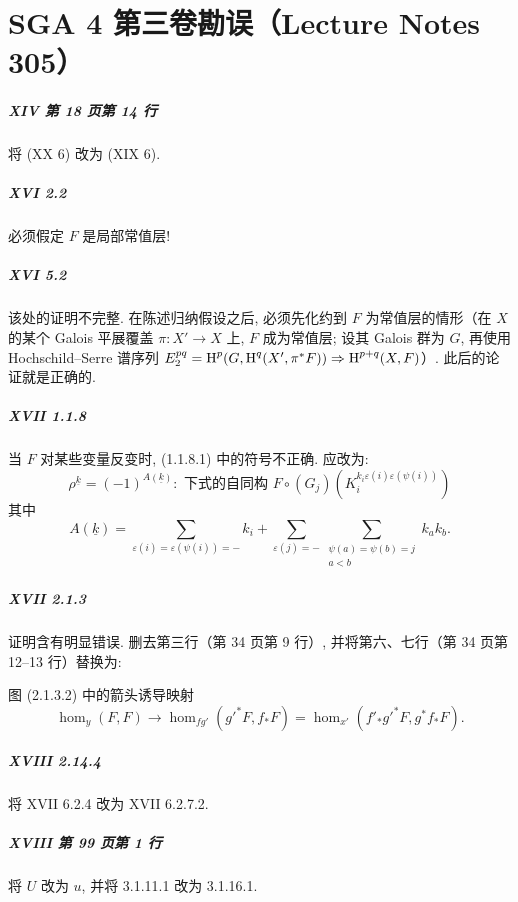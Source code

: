 \chapter*{SGA 4 第三卷勘误（Lecture Notes 305）}

\paragraph{XIV 第 18 页第 14 行}
将 (XX 6) 改为 (XIX 6).

\paragraph{XVI 2.2}
必须假定 $F$ 是局部常值层!

\paragraph{XVI 5.2}
该处的证明不完整. 在陈述归纳假设之后, 必须先化约到 $F$ 为常值层的情形（在 $X$ 的某个 Galois 平展覆盖 $\pi:X'\to X$ 上, $F$ 成为常值层; 设其 Galois 群为 $G$, 再使用 Hochschild--Serre 谱序列
$E_2^{p q}=\operatorname{H}^p(G,\operatorname{H}^q(X',\pi^\ast F))\Rightarrow \operatorname{H}^{p+q}(X,F)$）.
此后的论证就是正确的.

\paragraph{XVII 1.1.8}
当 $F$ 对某些变量反变时, (1.1.8.1) 中的符号不正确. 应改为:
\begin{equation*}\tag{1.1.8.1}
  \rho^{\underline k} = (-1)^{A(\underline k)}: \text{ 下式的自同构 }
F\circ (G_j)\left(K_i^{k_i\varepsilon(i)\varepsilon(\psi(i))}\right)
\end{equation*}
其中
\[
  A(\underline k) = \sum_{\varepsilon(i) = \varepsilon(\psi(i))=-} k_i + \sum_{\varepsilon(j)=-} \sum_{\substack{\psi(a)=\psi(b)=j \\ a<b}} k_a k_b .
\]

\paragraph{XVII 2.1.3}
证明含有明显错误. 删去第三行（第 34 页第 9 行）, 并将第六、七行（第 34 页第 12--13 行）替换为:

图 (2.1.3.2) 中的箭头诱导映射
\[
  \hom_y(F,F) \to \hom_{f g'}({g'}^\ast F,f_\ast F) = \hom_{x'}(f'_\ast {g'}^\ast F,g^\ast f_\ast F) \text{.}
\]

\paragraph{XVIII 2.14.4}
将 XVII 6.2.4 改为 XVII 6.2.7.2.

\paragraph{XVIII 第 99 页第 1 行}
将 $U$ 改为 $u$, 并将 3.1.11.1 改为 3.1.16.1.

\par
\clearpage
